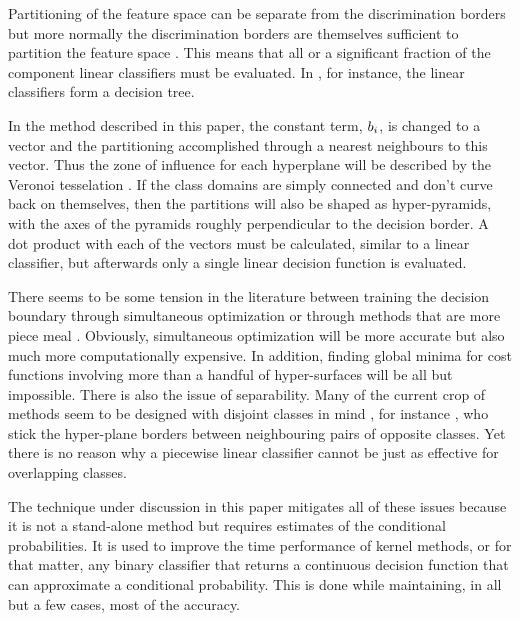 Partitioning of the feature space can be separate from the discrimination 
borders \citep{Huang_etal2013} but more normally the discrimination borders 
are themselves sufficient to partition the feature space 
\citep{Osborne1977,Lee_Richards1984,Bagirov2005,Kostin2006}.
This means that all or a significant fraction of the component
linear classifiers must be evaluated.
In \citet{Kostin2006}, for instance, the linear classifiers form a decision
tree.

In the method described in this paper, the constant term, $b_i$,
is changed to a vector and the partitioning accomplished through a nearest
neighbours to this vector. 
Thus the zone of influence for each hyperplane
will be described by the Veronoi tesselation \citep{Kohonen2000}.
If the class domains are simply connected and don't curve back on themselves, 
then the partitions will also be shaped as hyper-pyramids, 
with the axes of the pyramids roughly perpendicular to the decision border.
A dot product with each of the vectors must be calculated, similar
to a linear classifier, but afterwards only a single linear decision function is
evaluated.

There seems to be some tension in the literature between training the
decision boundary through simultaneous optimization \citep{Bagirov2005,Wang_Saligrama2013} or through
methods that are more piece meal \citep{Gai_Zhang2010,Herman_Yeung1992,Kostin2006}.
Obviously, simultaneous optimization will be more accurate but also much more computationally expensive.
In addition, finding global minima for cost functions 
involving more than a handful of hyper-surfaces will be all but impossible.
There is also the issue of separability. Many of the current crop of 
methods seem to be designed with disjoint classes in mind \citep{Herman_Yeung1992}, for instance
\citet{Gai_Zhang2010}, who stick the hyper-plane borders between 
neighbouring pairs of opposite classes.
Yet there is no reason why a piecewise linear classifier cannot be just as
effective for overlapping classes.

The technique under discussion in this paper mitigates all of these issues 
because it is not a stand-alone method but requires estimates
of the conditional probabilities.
It is used to improve the time performance of kernel methods, or for that matter,
any binary classifier that returns a continuous decision function 
that can approximate a conditional probability.
This is done while maintaining, in all but a few cases, most of the accuracy.

